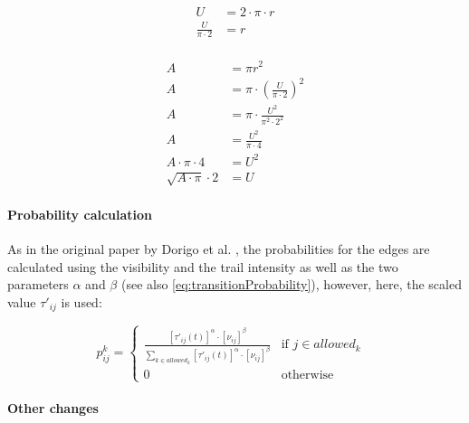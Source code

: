 \begin{minipage}[t][2.5cm][b]{0.4\textwidth}
	\begin{equation}
		\label{eq:scaleArea1}
		\begin{split}
			U &= 2 \cdot \pi \cdot r\\
			\frac{U}{\pi \cdot 2} &= r\\
		\end{split}
	\end{equation}
\end{minipage}
\begin{minipage}[t][2.5cm][b]{0.4\textwidth}
	\begin{equation}
		\label{eq:scaleArea2}
		\begin{split}
			A &= \pi r^2 \\
			A &= \pi \cdot \left(\frac{U}{\pi \cdot 2}\right)^2\\
			A &= \pi \cdot \frac{U^2}{\pi^2 \cdot 2^2}\\
			A &= \frac{U^2}{\pi \cdot 4}\\
			A \cdot \pi \cdot 4 &= U^2\\
			\sqrt{A \cdot \pi} \cdot 2 &= U
		\end{split}
	\end{equation}
\end{minipage}

\paragraph{Probability calculation}

As in the original paper by Dorigo et al. \cite{dorigo_ant_1996}, the probabilities for the edges are calculated using the visibility and the trail intensity as well as the two parameters $\alpha$ and $\beta$ (see also \ref{eq:transitionProbability}), however, here, the scaled value $\tau'_{ij}$ is used:

\begin{equation}\label{eq:transitionProbability2}
	p_{ij}^k = \begin{cases}
		\frac{[\tau'_{ij}(t)]^{\alpha} \cdot [\nu_{ij}]^{\beta}}{\sum_{k \in allowed_k} [\tau'_{ij}(t)]^{\alpha} \cdot [\nu_{ij}]^{\beta}} &\text{if $j \in allowed_k$ }\\
		0 &\text{otherwise}
	\end{cases}
\end{equation}

\paragraph{Other changes}

